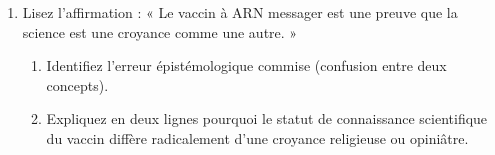 \documentclass[11pt]{article}
\begin{document}
\begin{exercice}
\begin{enumerate}
    \item Lisez l'affirmation : « Le vaccin à ARN messager est une preuve que la science est une croyance comme une autre. »
    \begin{enumerate}
        \item Identifiez l'erreur épistémologique commise (confusion entre deux concepts).
        \item Expliquez en deux lignes pourquoi le statut de connaissance scientifique du vaccin diffère radicalement d'une croyance religieuse ou opiniâtre.
    \end{enumerate}
\end{enumerate}
\end{exercice}
\end{document}
